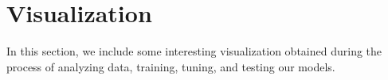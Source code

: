 \section{Visualization}
In this section, we include some interesting visualization obtained during the process of analyzing data, training, tuning, and testing our models. 

